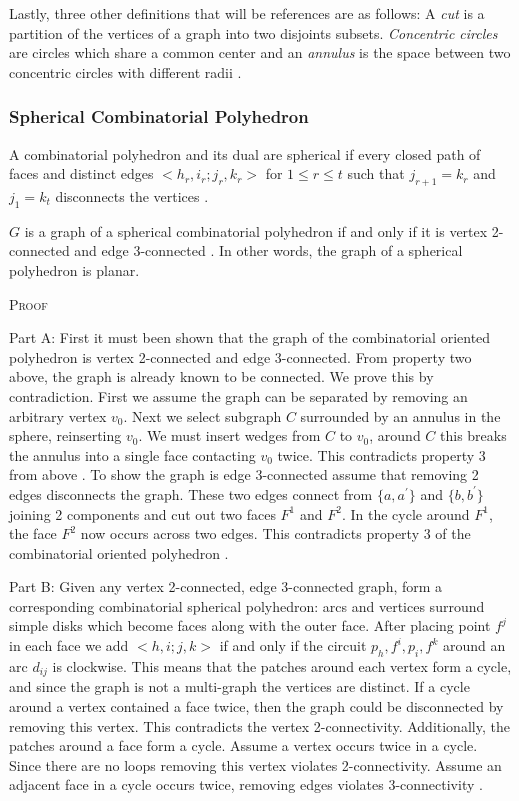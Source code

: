 \documentclass[11pt]{article}
\begin{document}
Lastly, three other definitions that will be references are as follows:
A \emph{cut} is a partition of the vertices of a graph into two disjoints subsets. \emph{Concentric circles} are circles which share a common center and an \emph{annulus} is the space between two concentric circles with different radii \cite{mathworld:ConcentricCircles}.

\subsubsection{Spherical Combinatorial Polyhedron}
A combinatorial polyhedron and its dual are spherical if every closed path of faces and distinct edges $<h_r,i_r;j_r,k_r>$ for $1 \leq r \leq t$ such that $j_{r+1} = k_r$ and $j_1 = k_t$ disconnects the vertices \cite{mccProof}.

$G$ is a graph of a spherical combinatorial polyhedron if and only if it is vertex 2-connected and edge 3-connected \cite{mccProof}. In other words, the graph of a spherical polyhedron is planar.

\textsc{Proof}

Part A: First it must been shown that the graph of the combinatorial oriented polyhedron is vertex 2-connected and edge 3-connected. From property two above, the graph is already known to be connected. We prove this by contradiction. First we assume the graph can be separated by removing an arbitrary vertex $v_0$. Next we select subgraph $C$ surrounded by an annulus in the sphere, reinserting $v_0$. We must insert wedges from $C$ to $v_0$, around $C$ this breaks the annulus into a single face contacting $v_0$ twice. This contradicts property 3 from above \cite{mccProof}.
To show the graph is edge 3-connected assume that removing 2 edges disconnects the graph. These two edges connect from $\{a,a^{'}\}$ and $\{b, b^{'}\}$ joining 2 components and cut out two faces $F^1$ and $F^2$. In the cycle around $F^1$, the face $F^2$ now occurs across two edges. This contradicts property 3 of the combinatorial oriented polyhedron \cite{mccProof}.

Part B:
Given any vertex 2-connected, edge 3-connected graph, form a corresponding combinatorial spherical polyhedron: arcs and vertices surround simple disks which become faces along with the outer face. After placing point $f^j$ in each face we add $<h,i;j,k>$ if and only if the circuit $p_h, f^i,p_i,f^k$ around an arc $d_{ij}$ is clockwise. This means that the patches around each vertex form a cycle, and since the graph is not a multi-graph the vertices are distinct. If a cycle around a vertex contained a face twice, then the graph could be disconnected by removing this vertex. This contradicts the vertex 2-connectivity. Additionally, the patches around a face form a cycle. Assume a vertex occurs twice in a cycle. Since there are no loops removing this vertex violates 2-connectivity. Assume an adjacent face in a cycle occurs twice, removing edges violates 3-connectivity \cite{mccProof}.
\end{document}
